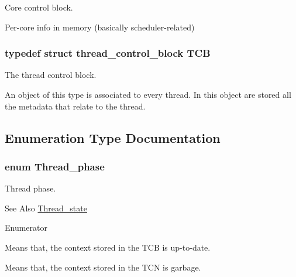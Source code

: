 Core control block. 

Per-\/core info in memory (basically scheduler-\/related) \hypertarget{group__scheduler_gaf88d9c946bf70b36a1e8bc34383abfc9}{
\subsubsection[{T\-C\-B}]{\setlength{\rightskip}{0pt plus 5cm}typedef struct {\bf thread\-\_\-control\-\_\-block}  {\bf T\-C\-B}}}\label{group__scheduler_gaf88d9c946bf70b36a1e8bc34383abfc9}


The thread control block. 

An object of this type is associated to every thread. In this object are stored all the metadata that relate to the thread. 

\subsection{Enumeration Type Documentation}
\hypertarget{group__scheduler_gab180b4aa356776bddcd724cef4f5deae}{
\subsubsection[{Thread\-\_\-phase}]{\setlength{\rightskip}{0pt plus 5cm}enum {\bf Thread\-\_\-phase}}}\label{group__scheduler_gab180b4aa356776bddcd724cef4f5deae}


Thread phase. 

\begin{DoxySeeAlso}{See Also}
\hyperlink{group__scheduler_ga6c969c169777f82c104cf73e501df70f}{Thread\-\_\-state} 
\end{DoxySeeAlso}
\begin{Desc}
\item[Enumerator]\par
\begin{description}
\item[{\em 
\hypertarget{group__scheduler_ggab180b4aa356776bddcd724cef4f5deaeaa826daca588e692c88114586b0de472b}{C\-T\-X\-\_\-\-C\-L\-E\-A\-N}\label{group__scheduler_ggab180b4aa356776bddcd724cef4f5deaeaa826daca588e692c88114586b0de472b}
}]Means that, the context stored in the T\-C\-B is up-\/to-\/date. \item[{\em 
\hypertarget{group__scheduler_ggab180b4aa356776bddcd724cef4f5deaea2b4b41fda67c1a83e6523675515c007b}{C\-T\-X\-\_\-\-D\-I\-R\-T\-Y}\label{group__scheduler_ggab180b4aa356776bddcd724cef4f5deaea2b4b41fda67c1a83e6523675515c007b}
}]Means that, the context stored in the T\-C\-N is garbage. \end{description}
\end{Desc}


